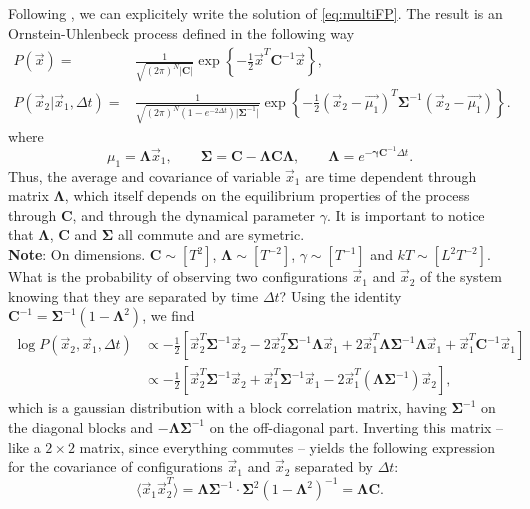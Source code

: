 \documentclass[10pt]{article}
\newcommand{\xo}{\vec{x}_1}
\newcommand{\xt}{\vec{x}_2}
\newcommand{\Lam}{\bm{\Lambda}}
\newcommand{\Sig}{\bm{\Sigma}}
\begin{document}
Following \cite{singh2017multiOU}, we can explicitely write the solution of \ref{eq:multiFP}. The result is an Ornstein-Uhlenbeck process defined in the following way
\begin{equation}
	\label{eq:multiOU}
	\begin{split}
		P(\vec{x}) =& \frac{1}{\sqrt{(2\pi)^N \vert \bm{C}\vert}}\exp\left\{ -\frac{1}{2}\vec{x}^T\bm{C}^{-1}\vec{x} \right\},\\
		P(\vec{x}_2 | \vec{x}_1, \Delta t) =& \frac{1}{\sqrt{(2\pi)^N(1-e^{-2\Delta t})\vert\bm{\Sigma}^{-1}\vert}}\exp\left\{ -\frac{1}{2}(\vec{x}_2 - \vec{\mu_1})^T\bm{\Sigma}^{-1}(\vec{x}_2 - \vec{\mu_1}) \right\}.
	\end{split}
\end{equation}
where 
$$ \mu_1 = \Lam\vec{x}_1, \qquad \bm{\Sigma} = \bm{C} - \Lam\bm{C}\Lam, \qquad \Lam = e^{-\bm{\gamma C}^{-1}\Delta t}.$$ Thus, the average and covariance of variable $\vec{x}_1$ are time dependent through matrix $\Lam$, which itself depends on the equilibrium properties of the process through $\bm{C}$, and through the dynamical parameter $\gamma$. It is important to notice that $\Lam$, $\bm{C}$ and $\bm{\Sigma}$ all commute and are symetric. \\

\textbf{Note}: On dimensions. $\bm{C}\sim [T^2]$, $\Lam\sim[T^{-2}]$, $\gamma\sim[T^{-1}]$ and $kT\sim[L^2T^{-2}]$.\\

What is the probability of observing two configurations $\vec{x}_1$ and $\vec{x}_2$ of the system knowing that they are separated by time $\Delta t$? Using the identity $\bm{C}^{-1} = \Sig^{-1}(1-\Lam^2)$, we find
\begin{equation}
	\label{eq:JointProbTwoVar}
	\begin{split}
		\log P(\vec{x}_2, \vec{x}_1, \Delta t) &\propto -\frac{1}{2}\left[ \xt^T\Sig^{-1}\xt - 2\xt^T\Sig^{-1}\Lam\xo + 2\xo^T\Lam\Sig^{-1}\Lam\xo + \xo^T\bm{C}^{-1}\xo \right]\\
					&\propto -\frac{1}{2}\left[ \xt^T\Sig^{-1}\xt + \xo^T\Sig^{-1}\xo - 2\xo^T(\Lam\Sig^{-1})\xt \right],
	\end{split}
\end{equation}
which is a gaussian distribution with a block correlation matrix, having $\Sig^{-1}$ on the diagonal blocks and $-\Lam\Sig^{-1}$ on the off-diagonal part. Inverting this matrix -- like a $2\times2$ matrix, since everything commutes -- yields the following expression for the covariance of configurations $\xo$ and $\xt$ separated by $\Delta t$:
\begin{equation}
	\langle\xo\xt^T\rangle = \Lam\Sig^{-1}\cdot\Sig^2(1-\Lam^2)^{-1} = \Lam \bm{C}.
\end{equation}
\end{document}
